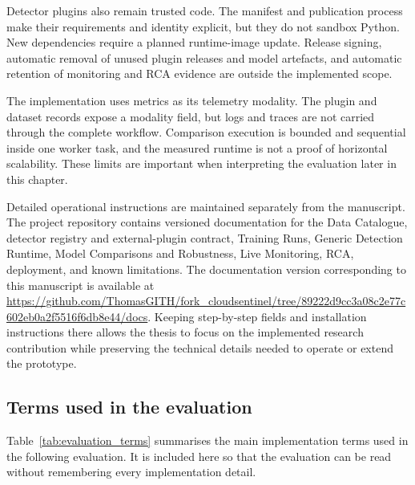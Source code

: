 Detector plugins also remain trusted code. The manifest and publication process make their requirements and identity explicit, but they do not sandbox Python. New dependencies require a planned runtime-image update. Release signing, automatic removal of unused plugin releases and model artefacts, and automatic retention of monitoring and RCA evidence are outside the implemented scope.

The implementation uses metrics as its telemetry modality. The plugin and dataset records expose a modality field, but logs and traces are not carried through the complete workflow. Comparison execution is bounded and sequential inside one worker task, and the measured runtime is not a proof of horizontal scalability. These limits are important when interpreting the evaluation later in this chapter.

Detailed operational instructions are maintained separately from the manuscript. The project repository contains versioned documentation for the Data Catalogue, detector registry and external-plugin contract, Training Runs, Generic Detection Runtime, Model Comparisons and Robustness, Live Monitoring, RCA, deployment, and known limitations. The documentation version corresponding to this manuscript is available at \url{https://github.com/ThomasGITH/fork_cloudsentinel/tree/89222d9cc3a08c2e77c602eb0a2f5516f6db8e44/docs}. Keeping step-by-step fields and installation instructions there allows the thesis to focus on the implemented research contribution while preserving the technical details needed to operate or extend the prototype.

\subsection{Terms used in the evaluation}

Table~\ref{tab:evaluation_terms} summarises the main implementation terms used in the following evaluation. It is included here so that the evaluation can be read without remembering every implementation detail.

